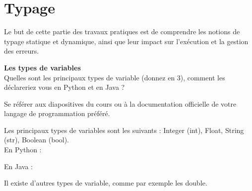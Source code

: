 \newpage

\section{Typage}

Le but de cette partie des travaux pratiques est de comprendre les notions de typage statique et dynamique, ainsi que leur impact sur l’exécution et la gestion des erreurs. \\

\begin{Exercice}[3 minutes]  \textbf{Les types de variables}\\
    
    Quelles sont les principaux types de variable (donnez en 3), comment les déclareriez vous en Python et en Java ? \\

    \begin{conseil}
    
        Se référer aux diapositives du cours ou à la documentation officielle de votre langage de programmation préféré.
        
    \end{conseil}
    \begin{solution}
    
        Les principaux types de variables sont les suivants : Integer (int), Float, String (str), Boolean (bool).\\

		En Python :    
        
    	 
    	
    	
    	En Java : 
    	
    	 
    	
    	Il existe d'autres types de variable, comme par exemple les double.
 
    \end{solution}
\end{Exercice}


